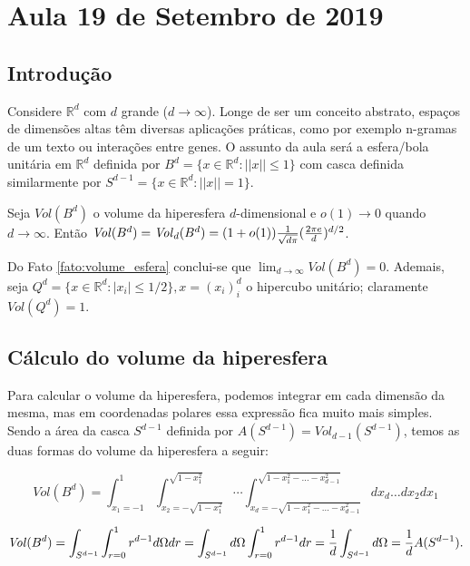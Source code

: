 \section{Aula 19 de Setembro de 2019}
\label{2019_09_19}

\subsection{Introdução}

Considere $\mathbb{R}^d$ com $d$ grande ($d \to \infty$). Longe de ser um conceito abstrato, espaços de dimensões altas têm diversas aplicações práticas, como por exemplo n-gramas de um texto ou interações entre genes. O assunto da aula \cite{blum2016foundations} será a esfera/bola unitária em $\mathbb{R}^d$ definida por $B^d = \{x \in \mathbb{R}^d: ||x|| \leqslant 1\}$ com casca definida similarmente por $S^{d-1} = \{x \in \mathbb{R}^d: ||x|| = 1\}$.

\begin{fato}
\label{fato:volume_esfera}
Seja $\mathit{Vol}(B^d)$ o volume da hiperesfera $d$-dimensional e $o(1) \to 0$ quando $d \to \infty$. Então $\mathit{Vol}(B^d) = \mathit{Vol}_d(B^d) = (1 + o(1)) {1 \over \sqrt{d\pi}} ({2 \pi e \over d})^{d/2}$.
\end{fato}

Do Fato \ref{fato:volume_esfera} conclui-se que $\lim_{d \to \infty} \mathit{Vol}(B^d) = 0$. Ademais, seja $Q^d = \{x \in \mathbb{R}^d: |x_i| \leqslant 1/2\}, x = (x_i)_i^d$ o hipercubo unitário; claramente $\mathit{Vol}(Q^d) = 1$.

\subsection{Cálculo do volume da hiperesfera}

Para calcular o volume da hiperesfera, podemos integrar em cada dimensão da mesma, mas em coordenadas polares essa expressão fica muito mais simples. Sendo a área da casca $S^{d-1}$ definida por $A(S^{d-1}) = \mathit{Vol}_{d-1}(S^{d-1})$, temos as duas formas do volume da hiperesfera a seguir:

$$\mathit{Vol}(B^d) = \int_{x_1  = -1}^1 \int_{x_2 = -\sqrt{1-x_1^2}}^{\sqrt{1-x_1^2}} \cdots \int_{x_d = -\sqrt{1 - x_1^2 - \dots - x_{d-1}^2}}^{\sqrt{1 - x_1^2 - \dots - x_{d-1}^2}} dx_d \dots dx_2 dx_1$$

$$\mathit{Vol}(B^d) = \int_{S^{d-1}} \int_{r = 0}^1 r^{d-1} d\Omega dr = \int_{S^{d-1}} d\Omega \int_{r = 0}^1 r^{d-1} dr = {1\over d} \int_{S^{d-1}} d\Omega = {1\over d} A(S^{d-1}).$$

